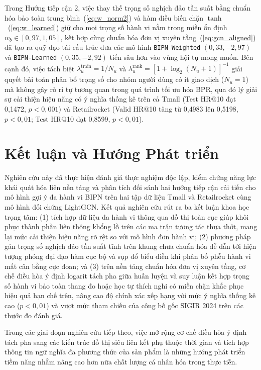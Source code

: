 \documentclass{llncs}
\begin{document}
Trong Hướng tiếp cận 2, việc thay thế trọng số nghịch đảo tần suất bằng chuẩn hóa bảo toàn trung bình~(\ref{eq:w_norm2}) và hàm điều biến chặn $\tanh$~(\ref{eq:w_learned}) giữ cho mọi trọng số hành vi nằm trong miền ổn định $w_b \in [0{,}97, 1{,}05]$, kết hợp cùng chuẩn hóa đơn vị xuyên tầng~(\ref{eq:gcn_aligned}) đã tạo ra quỹ đạo tái cấu trúc đưa các mô hình \texttt{BIPN-Weighted} $(0{,}33, -2{,}97)$ và \texttt{BIPN-Learned} $(0{,}35, -2{,}92)$ tiến sâu hơn vào vùng hội tụ mong muốn. Bên cạnh đó, việc tách biệt $\lambda_u^{\mathrm{train}} = 1/N_u$ và $\lambda_u^{\mathrm{rank}} = [1 + \log_2(N_u + 1)]^{-1}$ giải quyết bài toán phân bổ trọng số cho nhóm người dùng có ít giao dịch ($N_u = 1$) mà không gây rò rỉ tự tương quan trong quá trình tối ưu hóa BPR, qua đó lý giải sự cải thiện hiệu năng có ý nghĩa thống kê trên cả Tmall (Test HR@10 đạt 0{,}1472, $p < 0{,}001$) và Retailrocket (Valid HR@10 tăng từ 0{,}4983 lên 0{,}5198, $p < 0{,}01$; Test HR@10 đạt 0{,}8599, $p < 0{,}01$).

\section{Kết luận và Hướng Phát triển}
\label{sec:conclusion}

Nghiên cứu này đã thực hiện đánh giá thực nghiệm độc lập, kiểm chứng năng lực khái quát hóa liên nền tảng và phân tích đối sánh hai hướng tiếp cận cải tiến cho mô hình gợi ý đa hành vi BIPN trên hai tập dữ liệu Tmall và Retailrocket cùng mô hình đối chứng LightGCN. Kết quả nghiên cứu rút ra ba kết luận khoa học trọng tâm: (1) tích hợp dữ liệu đa hành vi thông qua đồ thị toàn cục giúp khôi phục thành phần liên thông khổng lồ trên các ma trận tương tác thưa thớt, mang lại mức cải thiện hiệu năng rõ rệt so với mô hình đơn hành vi; (2) phương pháp gán trọng số nghịch đảo tần suất tĩnh trên khung chưa chuẩn hóa dễ dẫn tới hiện tượng phóng đại đạo hàm cục bộ và sụp đổ biểu diễn khi phân bố phễu hành vi mất cân bằng cực đoan; và (3) trên nền tảng chuẩn hóa đơn vị xuyên tầng, cơ chế điều hòa ý định logarit tách pha giữa huấn luyện và suy luận kết hợp trọng số hành vi bảo toàn thang đo hoặc học tự thích nghi có miền chặn khắc phục hiệu quả hạn chế trên, nâng cao độ chính xác xếp hạng với mức ý nghĩa thống kê cao ($p < 0{,}01$) và vượt mức tham chiếu của công bố gốc SIGIR 2024 trên các thước đo đánh giá.

Trong các giai đoạn nghiên cứu tiếp theo, việc mở rộng cơ chế điều hòa ý định tách pha sang các kiến trúc đồ thị siêu liên kết phụ thuộc thời gian và tích hợp thông tin ngữ nghĩa đa phương thức của sản phẩm là những hướng phát triển tiềm năng nhằm nâng cao hơn nữa chất lượng cá nhân hóa trong thực tiễn.
\end{document}
